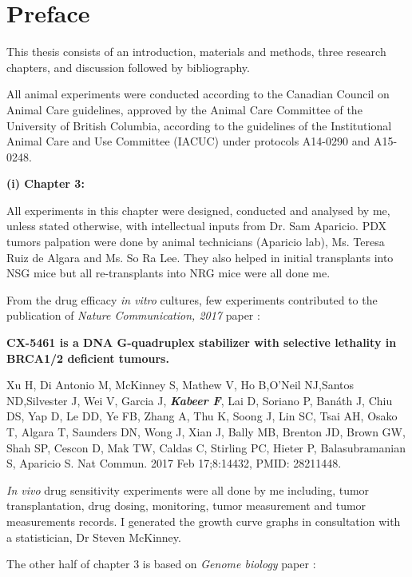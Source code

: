 
\chapter{Preface}
This thesis consists of an introduction, materials and methods, three research chapters, and discussion followed by bibliography.

All animal experiments were conducted according to the Canadian Council on Animal Care guidelines, approved by the Animal Care Committee of the University of British Columbia, according to the guidelines of the Institutional Animal Care and Use Committee (IACUC) under protocols A14-0290 and A15-0248.
  
  \textbf{(i) Chapter 3:}

All experiments in this chapter were designed, conducted and analysed by me, unless stated otherwise, with intellectual inputs from Dr. Sam Aparicio. PDX tumors palpation were done by animal technicians (Aparicio lab), Ms. Teresa Ruiz de Algara and Ms. So Ra Lee. They also helped in initial transplants into \ac{NSG} mice but all re-transplants into \ac{NRG} mice were all done me. 


From the drug efficacy \textit{in vitro} cultures, few experiments contributed to the publication of \textit{Nature Communication, 2017} paper \cite{xu2017cx}:

\textbf{CX-5461 is a DNA G-quadruplex stabilizer with selective lethality in BRCA1/2 deficient tumours.}

Xu H, Di Antonio M, McKinney S, Mathew V, Ho B,O'Neil NJ,Santos ND,Silvester J, Wei V, Garcia J, \emph{\textbf{Kabeer F}}, Lai D, Soriano P, Banáth J, Chiu DS, Yap D, Le DD, Ye FB, Zhang A, Thu K, Soong J, Lin SC, Tsai AH, Osako T, Algara T, Saunders DN, Wong J, Xian J, Bally MB, Brenton JD, Brown GW, Shah SP, Cescon D, Mak TW, Caldas C, Stirling PC, Hieter P, Balasubramanian S, Aparicio S. Nat Commun. 2017 Feb 17;8:14432, PMID: 28211448.



 \textit{In vivo} drug sensitivity experiments were all done by me including, tumor transplantation, drug dosing, monitoring, tumor measurement and tumor measurements records. I generated the growth curve graphs in consultation with a statistician, Dr Steven McKinney.


The other half of chapter 3 is based on \textit{Genome biology} paper \cite{o2019dissociation}:


